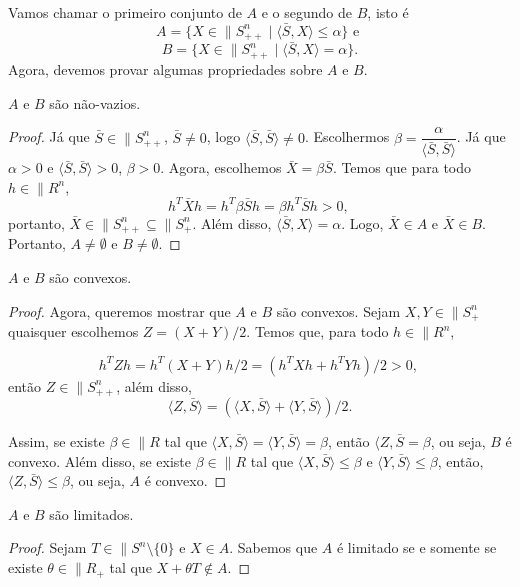 \begin{homeworkProblemAnswer}
Vamos chamar o primeiro conjunto de $A$ e o segundo de $B$, isto é
$$A = \{X \in \|{S}_{++}^{n} \mid \langle \bar{S}, X \rangle \leq \alpha \} \text{ e } $$
$$B = \{X \in \|{S}_{++}^{n} \mid \langle \bar{S}, X \rangle = \alpha \} \text{.} $$
Agora, devemos provar algumas propriedades sobre $A$ e $B$.
\begin{prop}
$A$ e $B$ são não-vazios.
\end{prop}
\begin{proof}
Já que $\bar{S} \in \|{S}_{++}^n$, $\bar{S} \neq 0$, logo $\langle \bar{S}, \bar{S} \rangle \neq 0$. Escolhermos $\beta = \dfrac{\alpha}{\langle \bar{S}, \bar{S} \rangle}$. Já que $\alpha > 0$ e $\langle \bar{S}, \bar{S} \rangle > 0$, $\beta > 0$. Agora, escolhemos $\bar{X} = \beta\bar{S}$. Temos que para todo $h \in \|{R}^n$,  
$$ h^T\bar{X}h = h^T\beta\bar{S}h = \beta h^T\bar{S}h > 0 \text{, } $$
portanto, $\bar{X} \in \|{S}_{++}^n \subseteq \|{S}_{+}^n$. Além disso, $\langle \bar{S}, X \rangle = \alpha$. Logo, $\bar{X} \in A$ e $\bar{X} \in B$. Portanto, $A \neq \emptyset$ e $B \neq \emptyset$.
\end{proof}

\begin{prop}
$A$ e $B$ são convexos.
\end{prop}
\begin{proof}
Agora, queremos mostrar que $A$ e $B$ são convexos. Sejam $X,Y \in \|{S}_{+}^n$ quaisquer escolhemos $Z = (X+Y)/2$. Temos que, para todo $h \in \|{R}^n$,

$$h^TZh = h^T(X+Y)h/2 = (h^TXh + h^TYh)/2 > 0 \text{, }$$
então $Z \in \|{S}_{++}^n$, além disso,
$$\langle Z, \bar{S} \rangle = (\langle X, \bar{S} \rangle + \langle Y, \bar{S} \rangle)/2 \text{.}$$

Assim, se existe $\beta \in \|{R}$ tal que $\langle X, \bar{S} \rangle = \langle Y, \bar{S} \rangle = \beta$, então $\langle Z, \bar{S} = \beta$, ou seja, $B$ é convexo. Além disso, se existe $\beta \in \|{R}$ tal que $\langle X, \bar{S} \rangle \leq \beta$ e $\langle Y, \bar{S} \rangle \leq \beta$, então, $\langle Z, \bar{S} \rangle \leq \beta$, ou seja, $A$ é convexo.
\end{proof}

\begin{prop}
$A$ e $B$ são limitados.
\end{prop}
\begin{proof}
Sejam $T \in \|{S}^n \setminus \{0\}$ e $X \in A$. Sabemos que $A$ é limitado se e somente se existe $\theta \in \|{R}_+$ tal que $X + \theta T \notin A$.  


\end{proof}
\end{homeworkProblemAnswer}
